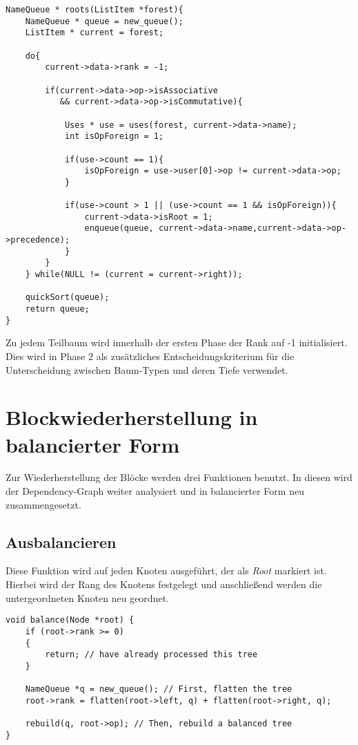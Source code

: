 \begin{lstlisting}[caption=Phase 1: Roots, label=list:roots]
NameQueue * roots(ListItem *forest){
	NameQueue * queue = new_queue();
	ListItem * current = forest;
	
	do{
		current->data->rank = -1;
		
		if(current->data->op->isAssociative 
		   && current->data->op->isCommutative){
			
			Uses * use = uses(forest, current->data->name);
			int isOpForeign = 1;          
			
			if(use->count == 1){
				isOpForeign = use->user[0]->op != current->data->op;
			}
			
			if(use->count > 1 || (use->count == 1 && isOpForeign)){               
				current->data->isRoot = 1;
				enqueue(queue, current->data->name,current->data->op->precedence);
			}
		}
	} while(NULL != (current = current->right));
	
	quickSort(queue);
	return queue;
}
\end{lstlisting}

Zu jedem Teilbaum wird innerhalb der ersten Phase der Rank auf -1 initialisiert. Dies wird in Phase 2 als zusätzliches Entscheidungskriterium für die  Unterscheidung zwischen Baum-Typen und deren Tiefe verwendet.

\section{Blockwiederherstellung in balancierter Form}
Zur Wiederherstellung der Blöcke werden drei Funktionen benutzt. In diesen wird der Dependency-Graph weiter analysiert und in balancierter Form neu zusammengesetzt.

\subsection{Ausbalancieren}
Diese Funktion wird auf jeden Knoten ausgeführt, der als \textit{Root} markiert ist. Hierbei wird der Rang des Knotens festgelegt und anschließend werden die untergeordneten Knoten neu geordnet.\\

\begin{lstlisting}[caption=Funktion balance(), label=list:Funktion balace()]
void balance(Node *root) {
	if (root->rank >= 0)
	{
		return; // have already processed this tree
	}

	NameQueue *q = new_queue(); // First, flatten the tree
	root->rank = flatten(root->left, q) + flatten(root->right, q);

	rebuild(q, root->op); // Then, rebuild a balanced tree
}
\end{lstlisting}

